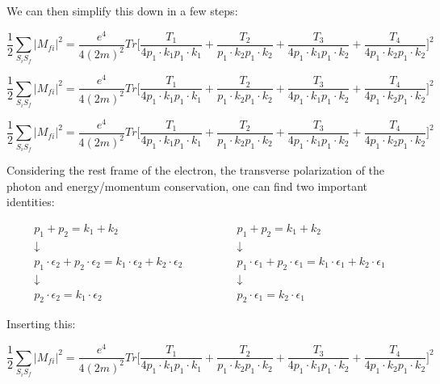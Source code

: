 \documentclass[a4]{article}
\begin{document}
    We can then simplify this down in a few steps:

    \begin{equation}
        \frac{1}{2} \sum_{S_i S_f} |M_{fi}|^2 = \frac{e^4}{4 (2m)^2} Tr \Bigg[ \frac{T_1}{4 p_1 \cdot k_1 p_1 \cdot k_1} + \frac{T_2}{p_1 \cdot k_2 p_1 \cdot k_2} + \frac{T_3}{4 p_1 \cdot k_1 p_1 \cdot k_2} + \frac{T_4}{4 p_1 \cdot k_2 p_1 \cdot k_2} \Bigg]^2
    \end{equation}

    \begin{equation}
        \frac{1}{2} \sum_{S_i S_f} |M_{fi}|^2 = \frac{e^4}{4 (2m)^2} Tr \Bigg[ \frac{T_1}{4 p_1 \cdot k_1 p_1 \cdot k_1} + \frac{T_2}{p_1 \cdot k_2 p_1 \cdot k_2} + \frac{T_3}{4 p_1 \cdot k_1 p_1 \cdot k_2} + \frac{T_4}{4 p_1 \cdot k_2 p_1 \cdot k_2} \Bigg]^2
    \end{equation}

    \begin{equation}
        \frac{1}{2} \sum_{S_i S_f} |M_{fi}|^2 = \frac{e^4}{4 (2m)^2} Tr \Bigg[ \frac{T_1}{4 p_1 \cdot k_1 p_1 \cdot k_1} + \frac{T_2}{p_1 \cdot k_2 p_1 \cdot k_2} + \frac{T_3}{4 p_1 \cdot k_1 p_1 \cdot k_2} + \frac{T_4}{4 p_1 \cdot k_2 p_1 \cdot k_2} \Bigg]^2
    \end{equation}

    Considering the rest frame of the electron, the transverse polarization of the photon and energy/momentum conservation, one can find two important identities:

    \begin{eqnarray}
        p_1 + p_2 = k_1 + k_2 \qquad & \qquad p_1 + p_2 = k_1 + k_2 \\
        \downarrow \qquad & \qquad \downarrow \\
        p_1 \cdot \epsilon_2 + p_2 \cdot \epsilon_2 = k_1 \cdot \epsilon_2 + k_2 \cdot \epsilon_2 \qquad & \qquad p_1 \cdot \epsilon_1 + p_2 \cdot \epsilon_1 = k_1 \cdot \epsilon_1 + k_2 \cdot \epsilon_1 \\
        \downarrow \qquad & \qquad \downarrow \\
        p_2 \cdot \epsilon_2 = k_1 \cdot \epsilon_2 \qquad & \qquad p_2 \cdot \epsilon_1 = k_2 \cdot \epsilon_1
    \end{eqnarray}

    Inserting this:

    \begin{equation}
        \frac{1}{2} \sum_{S_i S_f} |M_{fi}|^2 = \frac{e^4}{4 (2m)^2} Tr \Bigg[ \frac{T_1}{4 p_1 \cdot k_1 p_1 \cdot k_1} + \frac{T_2}{p_1 \cdot k_2 p_1 \cdot k_2} + \frac{T_3}{4 p_1 \cdot k_1 p_1 \cdot k_2} + \frac{T_4}{4 p_1 \cdot k_2 p_1 \cdot k_2} \Bigg]^2
    \end{equation}
\end{document}
